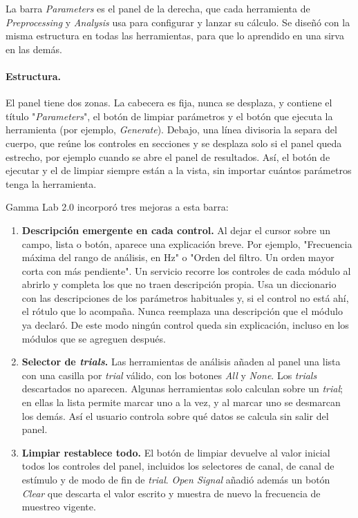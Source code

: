 \documentclass[12pt,letterpaper,oneside]{article}
\begin{document}
La barra \textit{Parameters} es el panel de la derecha, que cada herramienta de \textit{Preprocessing} y \textit{Analysis} usa para configurar y lanzar su cálculo. Se diseñó con la misma estructura en todas las herramientas, para que lo aprendido en una sirva en las demás.

\paragraph{Estructura.} El panel tiene dos zonas. La cabecera es fija, nunca se desplaza, y contiene el título "\textit{Parameters}", el botón de limpiar parámetros y el botón que ejecuta la herramienta (por ejemplo, \textit{Generate}). Debajo, una línea divisoria la separa del cuerpo, que reúne los controles en secciones y se desplaza solo si el panel queda estrecho, por ejemplo cuando se abre el panel de resultados. Así, el botón de ejecutar y el de limpiar siempre están a la vista, sin importar cuántos parámetros tenga la herramienta.

Gamma Lab 2.0 incorporó tres mejoras a esta barra:

\begin{enumerate}
    \item \textbf{Descripción emergente en cada control.} Al dejar el cursor sobre un campo, lista o botón, aparece una explicación breve. Por ejemplo, "Frecuencia máxima del rango de análisis, en Hz" o "Orden del filtro. Un orden mayor corta con más pendiente". Un servicio recorre los controles de cada módulo al abrirlo y completa los que no traen descripción propia. Usa un diccionario con las descripciones de los parámetros habituales y, si el control no está ahí, el rótulo que lo acompaña. Nunca reemplaza una descripción que el módulo ya declaró. De este modo ningún control queda sin explicación, incluso en los módulos que se agreguen después.

    \item \textbf{Selector de \textit{trials}.} Las herramientas de análisis añaden al panel una lista con una casilla por \textit{trial} válido, con los botones \textit{All} y \textit{None}. Los \textit{trials} descartados no aparecen. Algunas herramientas solo calculan sobre un \textit{trial}; en ellas la lista permite marcar uno a la vez, y al marcar uno se desmarcan los demás. Así el usuario controla sobre qué datos se calcula sin salir del panel.

    \item \textbf{Limpiar restablece todo.} El botón de limpiar devuelve al valor inicial todos los controles del panel, incluidos los selectores de canal, de canal de estímulo y de modo de fin de \textit{trial}. \textit{Open Signal} añadió además un botón \textit{Clear} que descarta el valor escrito y muestra de nuevo la frecuencia de muestreo vigente.
\end{enumerate}
\end{document}
